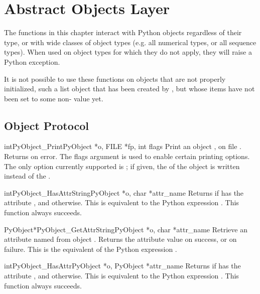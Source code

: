 \chapter{Abstract Objects Layer \label{abstract}}

The functions in this chapter interact with Python objects regardless
of their type, or with wide classes of object types (e.g. all
numerical types, or all sequence types).  When used on object types
for which they do not apply, they will raise a Python exception.

It is not possible to use these functions on objects that are not properly
initialized, such a list object that has been created by
, but whose items have not been set to some
non- value yet.

\section{Object Protocol \label{object}}

\begin{cfuncdesc}{int}{PyObject_Print}{PyObject *o, FILE *fp, int flags}
  Print an object , on file .  Returns  on
  error.  The flags argument is used to enable certain printing
  options.  The only option currently supported is
  ; if given, the  of the
  object is written instead of the .
\end{cfuncdesc}

\begin{cfuncdesc}{int}{PyObject_HasAttrString}{PyObject *o, char *attr_name}
  Returns  if  has the attribute , and
   otherwise.  This is equivalent to the Python expression
  .  This function always
  succeeds.
\end{cfuncdesc}

\begin{cfuncdesc}{PyObject*}{PyObject_GetAttrString}{PyObject *o,
                                                     char *attr_name}
  Retrieve an attribute named  from object .
  Returns the attribute value on success, or \NULL{} on failure.
  This is the equivalent of the Python expression
  .
\end{cfuncdesc}


\begin{cfuncdesc}{int}{PyObject_HasAttr}{PyObject *o, PyObject *attr_name}
  Returns  if  has the attribute , and
   otherwise.  This is equivalent to the Python expression
  .  This function always
  succeeds.
\end{cfuncdesc}


